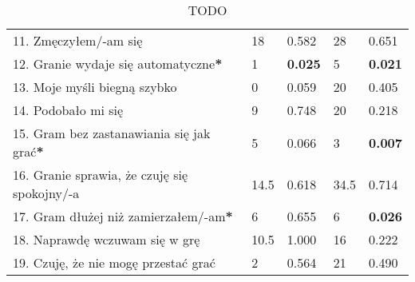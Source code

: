 \begin{table}[h!]
\begin{center}
\begin{tabular}{|m{10em}|m{5em}|m{5em}|m{5em}|m{5em}|}
            11. Zmęczyłem/-am się                                             & 18                     & 0.582          & 28                     & 0.651          \\
            12. Granie wydaje się automatyczne\textbf{*}                      & 1                      & \textbf{0.025} & 5                      & \textbf{0.021} \\
            13. Moje myśli \newline biegną szybko                             & 0                      & 0.059          & 20                     & 0.405          \\
            14. Podobało mi się                                               & 9                      & 0.748          & 20                     & 0.218          \\
            15. Gram bez zastanawiania się jak grać\textbf{*}                 & 5                      & 0.066          & 3                      & \textbf{0.007} \\
            16. Granie sprawia, \newline że czuję się spokojny/-a             & 14.5                   & 0.618          & 34.5                   & 0.714          \\
            17. Gram dłużej \newline niż zamierzałem/-am\textbf{*}            & 6                      & 0.655          & 6                      & \textbf{0.026} \\
            18. Naprawdę wczuwam się w grę                                    & 10.5                   & 1.000          & 16                     & 0.222          \\
            19. Czuję, że nie mogę przestać grać                              & 2                      & 0.564          & 21                     & 0.490          \\
            \hline
        \end{tabular}
    \end{center}
    \caption{TODO}\label{tab1:ch7_13}
\end{table}

